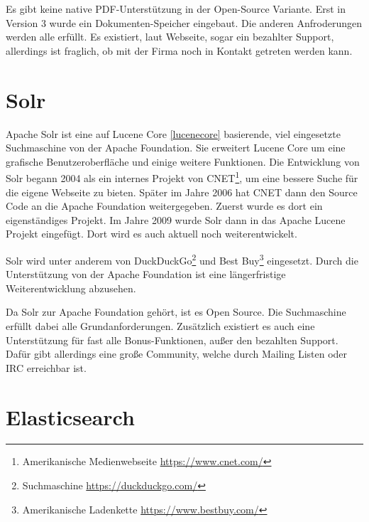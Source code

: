 Es gibt keine native PDF-Unterstützung in der Open-Source Variante. Erst in Version 3 wurde ein Dokumenten-Speicher eingebaut. Die anderen Anfroderungen werden alle erfüllt. Es existiert, laut Webseite, sogar ein bezahlter Support, allerdings ist fraglich, ob mit der Firma noch in Kontakt getreten werden kann. \cite{SphinxTechnologiesInc.2019}

\section{Solr}
\label{solr}

Apache Solr ist eine auf Lucene Core \ref{lucenecore} basierende, viel eingesetzte Suchmaschine von der Apache Foundation. Sie erweitert Lucene Core um eine grafische Benutzeroberfläche und einige weitere Funktionen. 
Die Entwicklung von Solr begann 2004 als ein internes Projekt von CNET\footnote{Amerikanische Medienwebseite \url{https://www.cnet.com/}}, um eine bessere Suche für die eigene Webseite zu bieten. Später im Jahre 2006 hat CNET dann den Source Code an die Apache Foundation weitergegeben. Zuerst wurde es dort ein eigenständiges Projekt. Im Jahre 2009 wurde Solr dann in das Apache Lucene Projekt eingefügt. Dort wird es auch aktuell noch weiterentwickelt. \cite{Wikipedia.2019b}

Solr wird unter anderem von DuckDuckGo\footnote{Suchmaschine \url{https://duckduckgo.com/}} und Best Buy\footnote{Amerikanische Ladenkette \url{https://www.bestbuy.com/}} eingesetzt. Durch die Unterstützung von der Apache Foundation ist eine längerfristige Weiterentwicklung abzusehen. 

Da Solr zur Apache Foundation gehört, ist es Open Source. Die Suchmaschine erfüllt dabei alle Grundanforderungen. Zusätzlich existiert es auch eine Unterstützung für fast alle Bonus-Funktionen, außer den bezahlten Support. Dafür gibt allerdings eine große Community, welche durch Mailing Listen oder IRC erreichbar ist. \cite{TheApacheSoftwareFoundation.2019}

\section{Elasticsearch}
\label{elasticsearch}

